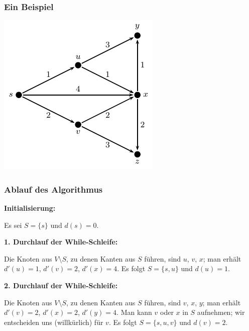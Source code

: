\documentclass[smaller]{beamer}
\begin{document}
\begin{frame}
\frametitle{Ein Beispiel}
\begin{center}
 \includegraphics{fig77.pdf}
\end{center}
\end{frame}

\begin{frame}
\frametitle{Ablauf des Algorithmus}
\textbf{Initialisierung:}

Es sei $S = \bigl\{ s \bigr\}$ und $d(s) = 0$. \\ \vspace*{0.2cm}

\textbf{1.	Durchlauf der While-Schleife:} 

Die Knoten aus $V \setminus S$, zu denen Kanten aus $S$ führen, sind $u$, $v$, $x$; man erhält $d'(u) = 1$, $d'(v) = 2$, $d'(x) = 4$. Es folgt $S = \bigl\{ s,u \bigr\}$ und $d(u) = 1$. \\ \vspace*{0.2cm}

\textbf{2.	Durchlauf der While-Schleife:} 

Die Knoten aus $V \setminus S$, zu denen Kanten aus $S$ führen, sind $v$, $x$, $y$; man erhält $d'(v) = 2$, $d'(x) = 2$, $d'(y) = 4$. Man kann $v$ oder $x$ in $S$ aufnehmen; wir entscheiden uns (willkürlich) für $v$. Es folgt $S = \bigl\{ s,u,v \bigr\}$ und $d(v) = 2$.


\end{frame}
\end{document}
